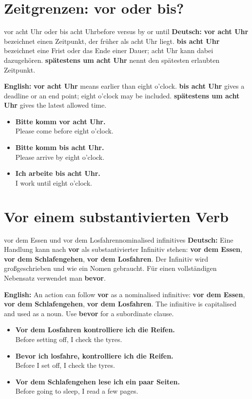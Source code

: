 \documentclass[a4paper,11pt]{article}
\newcommand{\GermanText}[1]{\textbf{Deutsch: }#1\par}
\newcommand{\EnglishText}[1]{{\small\color{SoftGray}\textbf{English: }#1\par}}
\newcommand{\ExampleItem}[2]{\item \textbf{#1}\\{\small\color{SoftGray}#2}}
\begin{document}
    \section{Zeitgrenzen: vor oder bis?}
        \begin{grammarentry}{vor acht Uhr oder bis acht Uhr}{before versus by or until}
            \GermanText{\textbf{vor acht Uhr} bezeichnet einen Zeitpunkt, der früher als acht Uhr liegt. \textbf{bis acht Uhr} bezeichnet eine Frist oder das Ende einer Dauer; acht Uhr kann dabei dazugehören. \textbf{spätestens um acht Uhr} nennt den spätesten erlaubten Zeitpunkt.}
            \EnglishText{\textbf{vor acht Uhr} means earlier than eight o'clock. \textbf{bis acht Uhr} gives a deadline or an end point; eight o'clock may be included. \textbf{spätestens um acht Uhr} gives the latest allowed time.}
        \end{grammarentry}
        \begin{exbox}
            \begin{itemize}
                \ExampleItem{Bitte komm vor acht Uhr.}{Please come before eight o'clock.}
                \ExampleItem{Bitte komm bis acht Uhr.}{Please arrive by eight o'clock.}
                \ExampleItem{Ich arbeite bis acht Uhr.}{I work until eight o'clock.}
            \end{itemize}
        \end{exbox}

    \section{Vor einem substantivierten Verb}
        \begin{grammarentry}{vor dem Essen und vor dem Losfahren}{nominalised infinitives}
            \GermanText{Eine Handlung kann nach \textbf{vor} als substantivierter Infinitiv stehen: \textbf{vor dem Essen}, \textbf{vor dem Schlafengehen}, \textbf{vor dem Losfahren}. Der Infinitiv wird großgeschrieben und wie ein Nomen gebraucht. Für einen vollständigen Nebensatz verwendet man \textbf{bevor}.}
            \EnglishText{An action can follow \textbf{vor} as a nominalised infinitive: \textbf{vor dem Essen}, \textbf{vor dem Schlafengehen}, \textbf{vor dem Losfahren}. The infinitive is capitalised and used as a noun. Use \textbf{bevor} for a subordinate clause.}
        \end{grammarentry}
        \begin{exbox}
            \begin{itemize}
                \ExampleItem{Vor dem Losfahren kontrolliere ich die Reifen.}{Before setting off, I check the tyres.}
                \ExampleItem{Bevor ich losfahre, kontrolliere ich die Reifen.}{Before I set off, I check the tyres.}
                \ExampleItem{Vor dem Schlafengehen lese ich ein paar Seiten.}{Before going to sleep, I read a few pages.}
            \end{itemize}
        \end{exbox}
\end{document}
